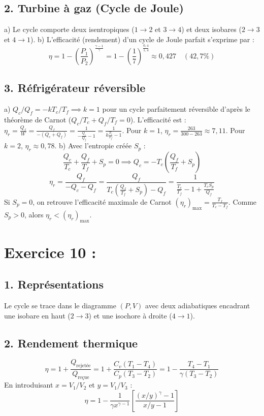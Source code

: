 \documentclass[a4paper,12pt]{article}
\begin{document}
 	\subsection*{2. Turbine à gaz (Cycle de Joule)}
 	a) Le cycle comporte deux isentropiques ($1\rightarrow2$ et $3\rightarrow4$) et deux isobares ($2\rightarrow3$ et $4\rightarrow1$).
 	b) L'efficacité (rendement) d'un cycle de Joule parfait s'exprime par :
 	\[ \eta = 1 - \left(\frac{P_1}{P_2}\right)^{\frac{\gamma-1}{\gamma}} = 1 - \left(\frac{1}{7}\right)^{\frac{0,4}{1,4}} \approx 0,427 \quad (42,7\%) \]
 	
 	\subsection*{3. Réfrigérateur réversible}
 	a) $Q_c/Q_f = -k T_c/T_f \implies k = 1$ pour un cycle parfaitement réversible d'après le théorème de Carnot ($Q_c/T_c + Q_f/T_f = 0$).
 	L'efficacité est : $\eta_r = \frac{Q_f}{W} = \frac{Q_f}{-(Q_c+Q_f)} = \frac{1}{-\frac{Q_c}{Q_f}-1} = \frac{1}{k\frac{T_c}{T_f} - 1}$.
 	Pour $k=1$, $\eta_{r} = \frac{263}{300-263} \approx 7,11$. Pour $k=2$, $\eta_{r} \approx 0,78$.
 	b) Avec l'entropie créée $S_p$ :
 	\[ \frac{Q_c}{T_c} + \frac{Q_f}{T_f} + S_p = 0 \implies Q_c = -T_c \left(\frac{Q_f}{T_f} + S_p\right) \]
 	\[ \eta_r = \frac{Q_f}{-Q_c - Q_f} = \frac{Q_f}{T_c\left(\frac{Q_f}{T_f} + S_p\right) - Q_f} = \frac{1}{\frac{T_c}{T_f} - 1 + \frac{T_c S_p}{Q_f}} \]
 	Si $S_p = 0$, on retrouve l'efficacité maximale de Carnot $(\eta_r)_{\text{max}} = \frac{T_f}{T_c - T_f}$. Comme $S_p > 0$, alors $\eta_r < (\eta_r)_{\text{max}}$.
 	
 	\section*{Exercice 10 : }
 	\subsection*{1. Représentations}
 	Le cycle se trace dans le diagramme $(P,V)$ avec deux adiabatiques encadrant une isobare en haut ($2\rightarrow 3$) et une isochore à droite ($4\rightarrow 1$).
 	
 	\subsection*{2. Rendement thermique}
 	\[ \eta = 1 + \frac{Q_{\text{rejetée}}}{Q_{\text{reçue}}} = 1 + \frac{C_v(T_1-T_4)}{C_p(T_3-T_2)} = 1 - \frac{T_4-T_1}{\gamma(T_3-T_2)} \]
 	En introduisant $x = V_1/V_2$ et $y = V_1/V_3$ :
 	\[ \eta = 1 - \frac{1}{\gamma x^{\gamma-1}} \left[ \frac{(x/y)^\gamma - 1}{x/y - 1} \right] \]
 	
\end{document}
